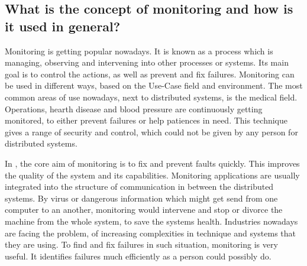 \subsection{What is the concept of monitoring and how is it used in general?}

\label{subsec:ConceptMonitoring}
Monitoring is getting popular nowadays. It is known as a process which is managing, observing and intervening into other processes or systems.\cite{Jammes2012} Its main goal is to control the actions, as well as prevent and fix failures.\cite{Dinu2011} Monitoring can be used in different ways, based on the Use-Case field and environment.\cite{Dinu2011} The most common areas of use nowadays, next to distributed systems,\cite{Jammes2012} is the medical field. Operations, hearth disease and blood pressure are continuously getting monitored, to either prevent failures or help patiences in need. This technique gives a range of security and control, which could not be given by any person for distributed systems.\cite{Jammes2012}

 In \isds, the core aim of monitoring is to fix and prevent faults quickly. This improves the quality of the system and its capabilities. Monitoring applications are usually integrated into the structure of communication in between the distributed systems.\cite{Jammes2012} By virus or dangerous information which might get send from one computer to an another, monitoring would intervene and stop or divorce the machine from the whole system, to save the systems health. Industries nowadays are facing the problem, of increasing complexities in technique and systems that they are using.\cite{Jammes2012} To find and fix failures in such situation, monitoring is very useful. It identifies failures much efficiently as a person could possibly do.\cite{Jammes2012}
 
